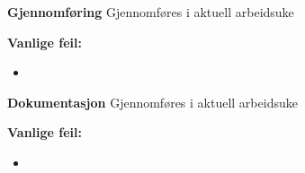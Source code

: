 \textbf{Gjennomføring}
Gjennomføres i aktuell arbeidsuke


\textbf{Vanlige feil:}
\begin{itemize}[noitemsep]
	\item 
\end{itemize}

\textbf{Dokumentasjon}
Gjennomføres i aktuell arbeidsuke


\textbf{Vanlige feil:}
\begin{itemize}[noitemsep]
	\item 
\end{itemize}




